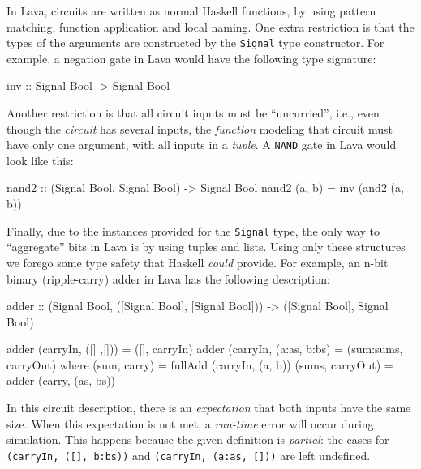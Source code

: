             In Lava, circuits are written as normal Haskell functions, by using pattern matching,
            function application and local naming.
            One extra restriction is that the types of the arguments are
            constructed by the \texttt{Signal} type constructor.
            For example, a negation gate in Lava would have the following type signature:

            \begin{haskellcode}
        inv :: Signal Bool -> Signal Bool
            \end{haskellcode}

            Another restriction is that all circuit inputs must be ``uncurried'', i.e.,
            even though the \emph{circuit} has several inputs, the \emph{function} modeling that circuit
            must have only one argument, with all inputs in a \emph{tuple}.
            A \texttt{NAND} gate in Lava would look like this:

            \begin{haskellcode}
        nand2 :: (Signal Bool, Signal Bool) -> Signal Bool
        nand2 (a, b) = inv (and2 (a, b))
            \end{haskellcode}

            Finally, due to the instances provided for the \texttt{Signal} type, the only way to
            ``aggregate'' bits in Lava is by using tuples and lists.
            Using only these structures we forego some type safety that Haskell \emph{could} provide.
            For example, an n-bit binary (ripple-carry) adder in Lava has the following description:

            \begin{haskellcode}
        adder :: (Signal Bool, ([Signal Bool], [Signal Bool]))
              -> ([Signal Bool], Signal Bool)

        adder (carryIn, ([] ,[]))    = ([], carryIn)
        adder (carryIn, (a:as, b:bs) = (sum:sums, carryOut)
            where (sum, carry)     = fullAdd (carryIn, (a, b))
                  (sums, carryOut) = adder (carry, (as, bs))
            \end{haskellcode}

            In this circuit description, there is an \emph{expectation} that both inputs have the same size.
            When this expectation is not met, a \emph{run-time} error will occur during simulation.
            This happens because the given definition is \emph{partial}:
            the cases for \texttt{(carryIn, ([], b:bs))} and \texttt{(carryIn, (a:as, []))} are left undefined.

